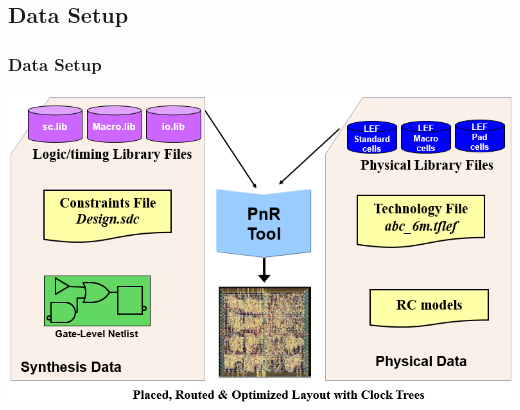 \documentclass[compress]{beamer}
\begin{document}
	\subsection[setup]{Data Setup}
		\begin{frame}
		\frametitle{Data Setup}
		\begin{center}
			\includegraphics[width=\textwidth]{Datasetup}
		\end{center}
	\end{frame}
\end{document}
